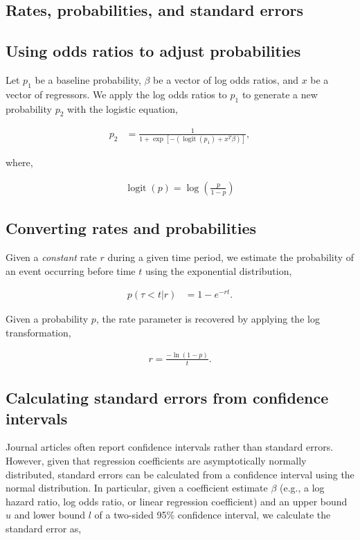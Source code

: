 \documentclass[11pt,final,fleqn]{article}\usepackage[]{graphicx}\usepackage[]{color}
\theoremstyle{plain}
\DeclareMathOperator{\logit}{logit}
\begin{document}
\begin{appendices}
\setcounter{table}{0}
\renewcommand{\thetable}{A\arabic{table}}
\setcounter{figure}{0}
\renewcommand{\thefigure}{A\arabic{figure}}
\setcounter{equation}{0}
\renewcommand{\theequation}{A\arabic{equation}}

\section{Rates, probabilities, and standard errors}\label{app:math}
\subsection{Using odds ratios to adjust probabilities}\label{app:odds-ratio-prob}
Let $p_1$ be a baseline probability, $\beta$ be a vector of log odds ratios, and $x$ be a vector of regressors. We apply the log odds ratios to $p_1$ to generate a new probability $p_2$ with the logistic equation,

\begin{align}
p_2 &= \frac{1}{1 + \exp\left[-\left(\logit(p_1) + x^T\beta \right)\right]},
\end{align}

where,

\begin{align}
\logit(p) = \log\left(\frac{p}{1-p}\right)
\end{align}

\subsection{Converting rates and probabilities}\label{app:rate-prob}
Given a \emph{constant} rate $r$ during a given time period, we estimate the probability of an event occurring before time $t$ using the exponential distribution,

\begin{align}
p(\tau < t |r) &= 1 - e^{-rt}.
\end{align}

Given a probability $p$, the rate parameter is recovered by applying the log transformation,

\begin{align}
r = \frac{-\ln(1-p)}{t}.
\end{align}

\subsection{Calculating standard errors from confidence intervals}\label{app:ci-se}
Journal articles often report confidence intervals rather than standard errors. However, given that regression coefficients are asymptotically normally distributed, standard errors can be calculated from a confidence interval using the normal distribution. In particular, given a coefficient estimate $\beta$ (e.g., a log hazard ratio, log odds ratio, or linear regression coefficient) and an upper bound $u$ and lower bound $l$ of a two-sided 95\% confidence interval, we calculate the standard error as,


\end{appendices}
\end{document}
